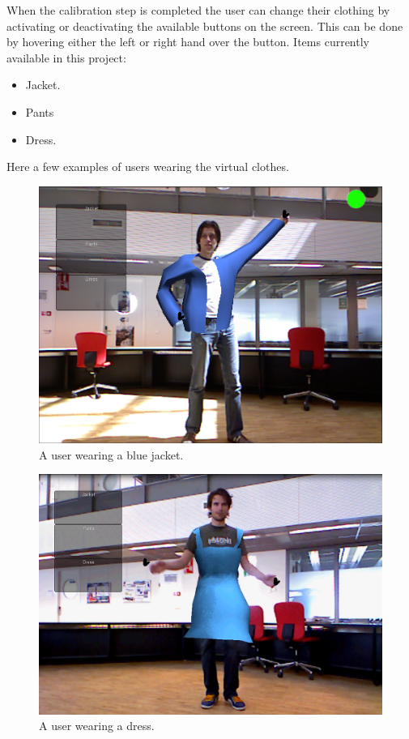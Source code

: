 \documentclass[a4paper]{article}
\begin{document}
When the calibration step is completed the user can change their clothing by activating or deactivating the available buttons on the screen. This can be done by hovering either the left or right hand over the button.
Items currently available in this project:
\begin{itemize}
\item Jacket.
\item Pants 
\item Dress.
\end{itemize}
Here a few examples of users wearing the virtual clothes.
\begin{figure}[h!]
\centering
\includegraphics[scale=0.4]{GUI_jacket_morris.png} 
\caption{A user wearing a blue jacket.}
\label{fig:jacket_morris}
\end{figure}

\begin{figure}[h!]
\centering
\includegraphics[scale=0.4]{dress_fedde.png} 
\caption{A user wearing a dress.}
\label{fig:dress_fedde}
\end{figure}
\end{document}
